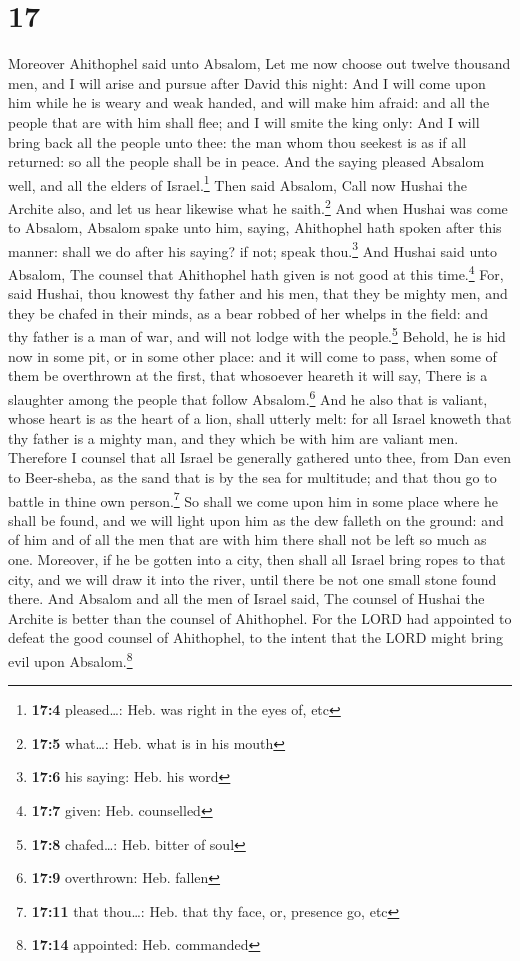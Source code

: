 \hypertarget{section-16}{%
\section{17}\label{section-16}}

 Moreover Ahithophel said unto Absalom, Let me now choose
out twelve thousand men, and I will arise and pursue after David this
night:  And I will come upon him while he is weary and
weak handed, and will make him afraid: and all the people that are with
him shall flee; and I will smite the king only:  And I
will bring back all the people unto thee: the man whom thou seekest is
as if all returned: so all the people shall be in peace. 
And the saying pleased Absalom well, and all the elders of
Israel.\footnote{\textbf{17:4} pleased\ldots: Heb. was right in the eyes
  of, etc}  Then said Absalom, Call now Hushai the Archite
also, and let us hear likewise what he saith.\footnote{\textbf{17:5}
  what\ldots: Heb. what is in his mouth}  And when Hushai
was come to Absalom, Absalom spake unto him, saying, Ahithophel hath
spoken after this manner: shall we do after his saying? if not; speak
thou.\footnote{\textbf{17:6} his saying: Heb. his word} 
And Hushai said unto Absalom, The counsel that Ahithophel hath given is
not good at this time.\footnote{\textbf{17:7} given: Heb. counselled}
 For, said Hushai, thou knowest thy father and his men,
that they be mighty men, and they be chafed in their minds, as a bear
robbed of her whelps in the field: and thy father is a man of war, and
will not lodge with the people.\footnote{\textbf{17:8} chafed\ldots:
  Heb. bitter of soul}  Behold, he is hid now in some pit,
or in some other place: and it will come to pass, when some of them be
overthrown at the first, that whosoever heareth it will say, There is a
slaughter among the people that follow Absalom.\footnote{\textbf{17:9}
  overthrown: Heb. fallen}  And he also that is valiant,
whose heart is as the heart of a lion, shall utterly melt: for all
Israel knoweth that thy father is a mighty man, and they which be with
him are valiant men.  Therefore I counsel that all Israel
be generally gathered unto thee, from Dan even to Beer-sheba, as the
sand that is by the sea for multitude; and that thou go to battle in
thine own person.\footnote{\textbf{17:11} that thou\ldots: Heb. that thy
  face, or, presence go, etc}  So shall we come upon him
in some place where he shall be found, and we will light upon him as the
dew falleth on the ground: and of him and of all the men that are with
him there shall not be left so much as one.  Moreover, if
he be gotten into a city, then shall all Israel bring ropes to that
city, and we will draw it into the river, until there be not one small
stone found there.  And Absalom and all the men of Israel
said, The counsel of Hushai the Archite is better than the counsel of
Ahithophel. For the LORD had appointed to defeat the good counsel of
Ahithophel, to the intent that the LORD might bring evil upon
Absalom.\footnote{\textbf{17:14} appointed: Heb. commanded}

